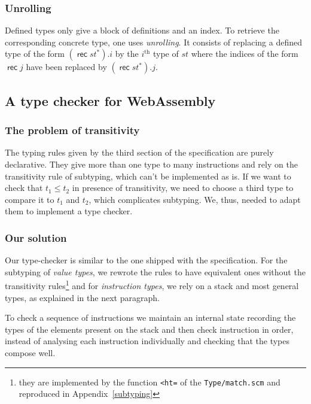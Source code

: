 \documentclass[a4paper,11pt]{article}
\DeclareMathOperator{\rect}{\textsf{rec}}
\begin{document}
\subsubsection{Unrolling}
Defined types only give a block of definitions and an index. To retrieve the
corresponding concrete type, one uses \emph{unrolling}. It consists of replacing
a defined type of the form $(\rect st^*).i$ by the $i^{\text{th}}$ type of $st$
where the indices of the form $\rect j$ have been replaced by $(\rect st^*).j$.

\subsection{A type checker for WebAssembly}
\subsubsection{The problem of transitivity}
The typing rules given by the third section of the specification are purely
declarative. They give more than one type to many instructions and rely on the
transitivity rule of subtyping, which can't be implemented as is. If we want to
check that $t_1 \leq t_2$ in presence of transitivity, we need to choose a third
type to compare it to $t_1$ and $t_2$, which complicates subtyping. We, thus,
needed to adapt them to implement a type checker.

\subsubsection{Our solution}
Our type-checker is similar to the one shipped with the specification. For the
subtyping of \emph{value types}, we rewrote the rules to have equivalent ones
without the transitivity rules\footnote{they are implemented by the function
\texttt{<ht=} of the \texttt{Type/match.scm} and reproduced in
Appendix~\ref{subtyping}} and for \emph{instruction types}, we rely on a stack
and most general types, as explained in the next paragraph.

To check a sequence of instructions we maintain an internal state recording the
types of the elements present on the stack and then check instruction in order,
instead of analysing each instruction individually and checking that the types
compose well.
\end{document}
